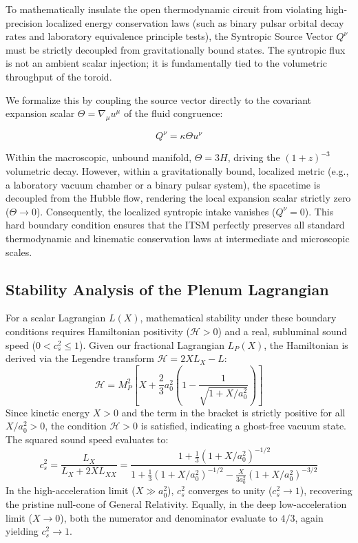 \documentclass[aps,prd,10pt,onecolumn,superscriptaddress,nofootinbib]{revtex4-2}
\begin{document}
To mathematically insulate the open thermodynamic circuit from violating high-precision localized energy conservation laws (such as binary pulsar orbital decay rates and laboratory equivalence principle tests), the Syntropic Source Vector $Q^\nu$ must be strictly decoupled from gravitationally bound states. The syntropic flux is not an ambient scalar injection; it is fundamentally tied to the volumetric throughput of the toroid. 

We formalize this by coupling the source vector directly to the covariant expansion scalar $\Theta = \nabla_\mu u^\mu$ of the fluid congruence:

\begin{equation}
Q^\nu = \kappa \Theta u^\nu
\end{equation}

Within the macroscopic, unbound manifold, $\Theta = 3H$, driving the $(1+z)^{-3}$ volumetric decay. However, within a gravitationally bound, localized metric (e.g., a laboratory vacuum chamber or a binary pulsar system), the spacetime is decoupled from the Hubble flow, rendering the local expansion scalar strictly zero ($\Theta \to 0$). Consequently, the localized syntropic intake vanishes ($Q^\nu = 0$). This hard boundary condition ensures that the ITSM perfectly preserves all standard thermodynamic and kinematic conservation laws at intermediate and microscopic scales.

\subsection{Stability Analysis of the Plenum Lagrangian}
For a scalar Lagrangian $L(X)$, mathematical stability under these boundary conditions requires Hamiltonian positivity ($\mathcal{H} > 0$) and a real, subluminal sound speed ($0 < c_s^2 \le 1$). Given our fractional Lagrangian $L_P(X)$, the Hamiltonian is derived via the Legendre transform $\mathcal{H} = 2X L_X - L$:
\begin{equation}
\mathcal{H} = M_P^2 \left[ X + \frac{2}{3}a_0^2 \left( 1 - \frac{1}{\sqrt{1+X/a_0^2}} \right) \right]
\end{equation}
Since kinetic energy $X > 0$ and the term in the bracket is strictly positive for all $X/a_0^2 > 0$, the condition $\mathcal{H} > 0$ is satisfied, indicating a ghost-free vacuum state. The squared sound speed evaluates to:
\begin{equation}
c_s^2 = \frac{L_X}{L_X + 2X L_{XX}} = \frac{1 + \frac{1}{3}(1+X/a_0^2)^{-1/2}}{1 + \frac{1}{3}(1+X/a_0^2)^{-1/2} - \frac{X}{3a_0^2}(1+X/a_0^2)^{-3/2}}
\end{equation}
In the high-acceleration limit ($X \gg a_0^2$), $c_s^2$ converges to unity ($c_s^2 \rightarrow 1$), recovering the pristine null-cone of General Relativity. Equally, in the deep low-acceleration limit ($X \to 0$), both the numerator and denominator evaluate to $4/3$, again yielding $c_s^2 \to 1$.
\end{document}

